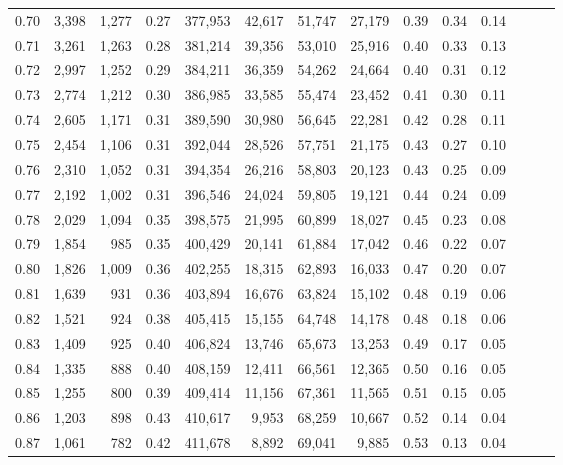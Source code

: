 \begin{tabular}{rrrrrrrrrrrrrr}
0.70 &   3,398 &  1,277 &  0.27 &  377,953 &   42,617 &  51,747 &  27,179 &  0.39 &  0.34 &      0.14 \\
0.71 &   3,261 &  1,263 &  0.28 &  381,214 &   39,356 &  53,010 &  25,916 &  0.40 &  0.33 &      0.13 \\
0.72 &   2,997 &  1,252 &  0.29 &  384,211 &   36,359 &  54,262 &  24,664 &  0.40 &  0.31 &      0.12 \\
0.73 &   2,774 &  1,212 &  0.30 &  386,985 &   33,585 &  55,474 &  23,452 &  0.41 &  0.30 &      0.11 \\
0.74 &   2,605 &  1,171 &  0.31 &  389,590 &   30,980 &  56,645 &  22,281 &  0.42 &  0.28 &      0.11 \\
0.75 &   2,454 &  1,106 &  0.31 &  392,044 &   28,526 &  57,751 &  21,175 &  0.43 &  0.27 &      0.10 \\
0.76 &   2,310 &  1,052 &  0.31 &  394,354 &   26,216 &  58,803 &  20,123 &  0.43 &  0.25 &      0.09 \\
0.77 &   2,192 &  1,002 &  0.31 &  396,546 &   24,024 &  59,805 &  19,121 &  0.44 &  0.24 &      0.09 \\
0.78 &   2,029 &  1,094 &  0.35 &  398,575 &   21,995 &  60,899 &  18,027 &  0.45 &  0.23 &      0.08 \\
0.79 &   1,854 &    985 &  0.35 &  400,429 &   20,141 &  61,884 &  17,042 &  0.46 &  0.22 &      0.07 \\
0.80 &   1,826 &  1,009 &  0.36 &  402,255 &   18,315 &  62,893 &  16,033 &  0.47 &  0.20 &      0.07 \\
0.81 &   1,639 &    931 &  0.36 &  403,894 &   16,676 &  63,824 &  15,102 &  0.48 &  0.19 &      0.06 \\
0.82 &   1,521 &    924 &  0.38 &  405,415 &   15,155 &  64,748 &  14,178 &  0.48 &  0.18 &      0.06 \\
0.83 &   1,409 &    925 &  0.40 &  406,824 &   13,746 &  65,673 &  13,253 &  0.49 &  0.17 &      0.05 \\
0.84 &   1,335 &    888 &  0.40 &  408,159 &   12,411 &  66,561 &  12,365 &  0.50 &  0.16 &      0.05 \\
0.85 &   1,255 &    800 &  0.39 &  409,414 &   11,156 &  67,361 &  11,565 &  0.51 &  0.15 &      0.05 \\
0.86 &   1,203 &    898 &  0.43 &  410,617 &    9,953 &  68,259 &  10,667 &  0.52 &  0.14 &      0.04 \\
0.87 &   1,061 &    782 &  0.42 &  411,678 &    8,892 &  69,041 &   9,885 &  0.53 &  0.13 &      0.04 \\

\end{tabular}
